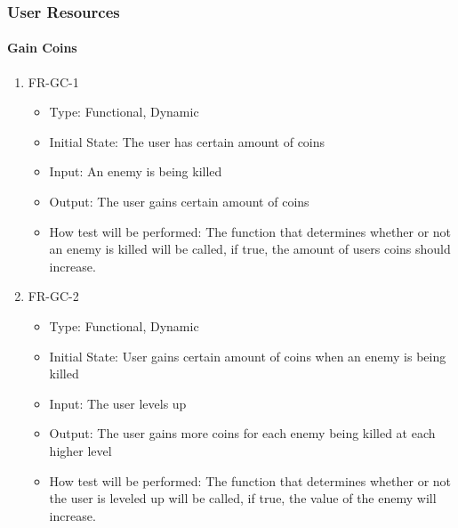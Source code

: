 \documentclass[12,english]{article}
\begin{document}
\subsubsection{User Resources}

\paragraph{Gain Coins}
\begin{enumerate}
  \item FR-GC-1
  \begin{itemize}
      \item Type: Functional, Dynamic
      \item Initial State: The user has certain amount of coins
      \item Input: An enemy is being killed 
      \item Output: The user gains certain amount of coins
      \item How test will be performed: The function that determines whether or not an enemy is killed will be called, if true, the amount of user\textcolor{red}{\textquotesingle}s coins should increase.  
  \end{itemize}
  \item FR-GC-2
  \begin{itemize}
      \item Type: Functional, Dynamic
      \item Initial State: User gains certain amount of coins when an enemy is being killed
      \item Input: The user levels up
      \item Output: The user gains more coins for each enemy being killed at each higher level 
      \item How test will be performed: The function that determines whether or not the user is leveled up will be called, if true, the value of the enemy will increase.  
  \end{itemize}
\end{enumerate}
\end{document}
